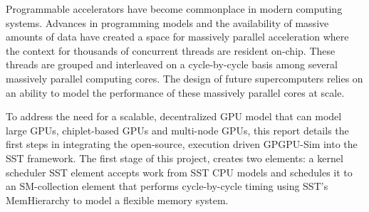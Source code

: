 Programmable accelerators have become commonplace in modern computing systems.
Advances in programming models and the availability of massive amounts of data
have created a space for massively parallel acceleration where the context for
thousands of concurrent threads are resident on-chip. These threads are grouped
and interleaved on a cycle-by-cycle basis among several massively parallel
computing cores. The design of future supercomputers relies on an ability to
model the performance of these massively parallel cores at scale.

To address the need for a scalable, decentralized GPU model that can model large
GPUs, chiplet-based GPUs and multi-node GPUs, this report details the first
steps in integrating the open-source, execution driven GPGPU-Sim into the SST
framework. The first stage of this project, creates two elements: a kernel
scheduler SST element accepts work from SST CPU models and schedules it to an
SM-collection element that performs cycle-by-cycle timing using SST’s
MemHierarchy to model a flexible memory system.
